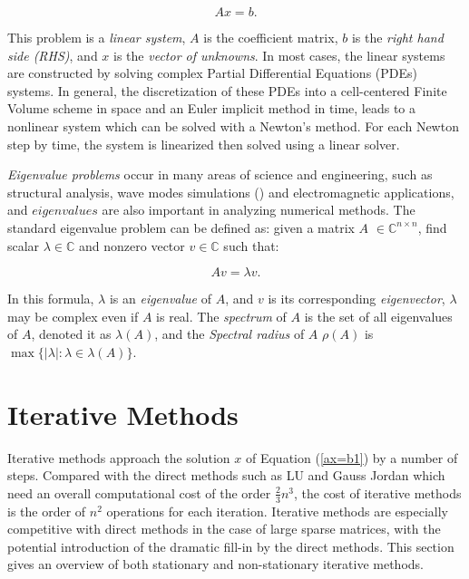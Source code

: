 \begin{equation}
\label{ax=b1}
Ax=b.
\end{equation}

This problem is a \textit{linear system}, $A$ is the coefficient matrix, $b$ is the \textit{right hand side (RHS)}, and $x$ is the \textit{vector of unknowns}. In most cases, the linear systems are constructed by solving complex Partial Differential Equations (PDEs) systems. In general, the discretization of these PDEs into a cell-centered Finite Volume scheme in space and an Euler implicit method in time, leads to a nonlinear system which can be solved with a Newton’s method. For each Newton step by time, the system is linearized then solved using a linear solver.

\textit{Eigenvalue problems} occur in many areas of science and engineering, such as structural analysis, wave modes simulations (\cite{liu2018highly}) and electromagnetic applications, and $eigenvalues$ are also important in analyzing numerical methods. The standard eigenvalue problem can be defined as: given a matrix $A$ $\in \mathbb{C}^{n \times n}$, find scalar $\lambda \in \mathbb{C}$ and nonzero vector $v \in \mathbb{C}$ such that: 

\begin{equation}
\label{av=lv}
Av=\lambda v.
\end{equation}

In this formula, $\lambda$ is an \textit{eigenvalue} of $A$, and $v$ is its corresponding \textit{eigenvector}, $\lambda$ may be complex even if $A$ is real. The \textit{spectrum} of $A$ is the set of all eigenvalues of $A$, denoted it as $\lambda(A)$, and the \textit{Spectral radius} of $A$ $\rho(A)$ is $\max\{|\lambda|: \lambda \in \lambda(A)\}$. 

\section{Iterative Methods}

Iterative methods approach the solution $x$ of Equation (\ref{ax=b1}) by a number of steps. Compared with the direct methods such as LU and Gauss Jordan which need an overall computational cost of the order $\frac{2}{3}n^3$, the cost of iterative methods is the order of $n^2$ operations for each iteration. Iterative methods are especially competitive with direct methods in the case of large sparse matrices, with the potential introduction of the dramatic fill-in by the direct methods. This section gives an overview of both stationary and non-stationary iterative methods.

